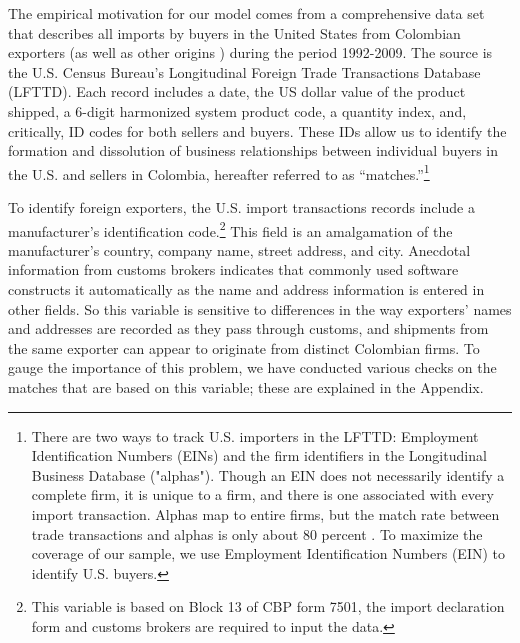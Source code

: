 The empirical motivation for our model comes from a comprehensive data set
that describes all imports by buyers in the United States from Colombian
exporters (as well as other origins ) during the period 1992-2009. The
source is the U.S. Census Bureau's Longitudinal Foreign Trade Transactions
Database (LFTTD). Each record includes a date, the US dollar value of the
product shipped, a 6-digit harmonized system product code, a quantity index,
and, critically, ID codes for both sellers and buyers. These IDs allow us to
identify the formation and dissolution of business relationships between
individual buyers in the U.S. and sellers in Colombia, hereafter referred to
as \textquotedblleft matches.\textquotedblright \footnote{%
There are two ways to track U.S. importers in the LFTTD: Employment
Identification Numbers (EINs) and the firm identifiers in the Longitudinal
Business Database ("alphas"). Though an EIN does not necessarily identify a
complete firm, it is unique to a firm, and there is one associated with
every import transaction. Alphas map to entire firms, but the match rate
between trade transactions and alphas is only about 80 percent \citep{bernard2007firms}. To maximize the coverage of our sample, we use
Employment Identification Numbers (EIN) to identify U.S. buyers.\medskip}\ 

To identify foreign exporters, the U.S. import transactions records include
a manufacturer's identification code.\footnote{%
This variable is based on Block 13 of CBP form 7501, the import declaration
form and customs brokers are required to input the data.} This field is an
amalgamation of the manufacturer's country, company name, street address,
and city. Anecdotal information from customs brokers indicates that commonly
used software constructs it automatically as the name and address
information is entered in other fields. So this variable is sensitive to
differences in the way exporters' names and addresses are recorded as they
pass through customs, and shipments from the same exporter can appear to
originate from distinct Colombian firms. To gauge the importance of this
problem, we have conducted various checks on the matches that are based on
this variable; these are explained in the Appendix.

